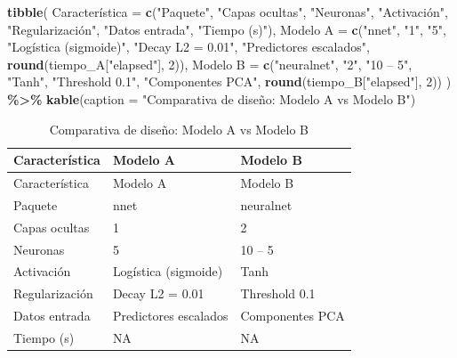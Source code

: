 \documentclass[
]{article}
\newenvironment{Shaded}{\begin{snugshade}}{\end{snugshade}}
\newcommand{\AttributeTok}[1]{\textcolor[rgb]{0.13,0.29,0.53}{#1}}
\newcommand{\DecValTok}[1]{\textcolor[rgb]{0.00,0.00,0.81}{#1}}
\newcommand{\FunctionTok}[1]{\textcolor[rgb]{0.13,0.29,0.53}{\textbf{#1}}}
\newcommand{\NormalTok}[1]{#1}
\newcommand{\OtherTok}[1]{\textcolor[rgb]{0.56,0.35,0.01}{#1}}
\newcommand{\SpecialCharTok}[1]{\textcolor[rgb]{0.81,0.36,0.00}{\textbf{#1}}}
\newcommand{\StringTok}[1]{\textcolor[rgb]{0.31,0.60,0.02}{#1}}
\begin{document}
\begin{Shaded}
\begin{Highlighting}[]
\FunctionTok{tibble}\NormalTok{(}
\NormalTok{  Característica  }\OtherTok{=} \FunctionTok{c}\NormalTok{(}\StringTok{"Paquete"}\NormalTok{, }\StringTok{"Capas ocultas"}\NormalTok{, }\StringTok{"Neuronas"}\NormalTok{, }\StringTok{"Activación"}\NormalTok{,}
                       \StringTok{"Regularización"}\NormalTok{, }\StringTok{"Datos entrada"}\NormalTok{, }\StringTok{"Tiempo (s)"}\NormalTok{),}
  \StringTok{\textasciigrave{}}\AttributeTok{Modelo A}\StringTok{\textasciigrave{}}      \OtherTok{=} \FunctionTok{c}\NormalTok{(}\StringTok{"nnet"}\NormalTok{, }\StringTok{"1"}\NormalTok{, }\StringTok{"5"}\NormalTok{, }\StringTok{"Logística (sigmoide)"}\NormalTok{,}
                       \StringTok{"Decay L2 = 0.01"}\NormalTok{, }\StringTok{"Predictores escalados"}\NormalTok{,}
                       \FunctionTok{round}\NormalTok{(tiempo\_A[}\StringTok{"elapsed"}\NormalTok{], }\DecValTok{2}\NormalTok{)),}
  \StringTok{\textasciigrave{}}\AttributeTok{Modelo B}\StringTok{\textasciigrave{}}      \OtherTok{=} \FunctionTok{c}\NormalTok{(}\StringTok{"neuralnet"}\NormalTok{, }\StringTok{"2"}\NormalTok{, }\StringTok{"10 – 5"}\NormalTok{, }\StringTok{"Tanh"}\NormalTok{,}
                       \StringTok{"Threshold 0.1"}\NormalTok{, }\StringTok{"Componentes PCA"}\NormalTok{,}
                       \FunctionTok{round}\NormalTok{(tiempo\_B[}\StringTok{"elapsed"}\NormalTok{], }\DecValTok{2}\NormalTok{))}
\NormalTok{) }\SpecialCharTok{\%\textgreater{}\%}
  \FunctionTok{kable}\NormalTok{(}\AttributeTok{caption =} \StringTok{"Comparativa de diseño: Modelo A vs Modelo B"}\NormalTok{)}
\end{Highlighting}
\end{Shaded}

\begin{longtable}[]{@{}lll@{}}
\caption{Comparativa de diseño: Modelo A vs Modelo B}\tabularnewline
\toprule\noalign{}
Característica & Modelo A & Modelo B \\
\midrule\noalign{}
\endfirsthead
\toprule\noalign{}
Característica & Modelo A & Modelo B \\
\midrule\noalign{}
\endhead
\bottomrule\noalign{}
\endlastfoot
Paquete & nnet & neuralnet \\
Capas ocultas & 1 & 2 \\
Neuronas & 5 & 10 -- 5 \\
Activación & Logística (sigmoide) & Tanh \\
Regularización & Decay L2 = 0.01 & Threshold 0.1 \\
Datos entrada & Predictores escalados & Componentes PCA \\
Tiempo (s) & NA & NA \\
\end{longtable}
\end{document}
